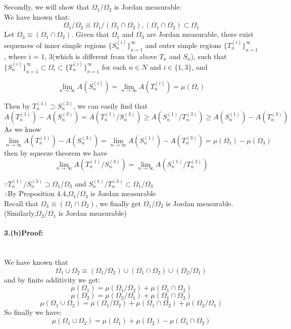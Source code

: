\documentclass{article}
\begin{document}
\\ \\
Secondly, we will show that $\Omega_1\slash \Omega_2$ is Jordan measurable:\\
We have known that:
$$\Omega_1\slash \Omega_2\equiv \Omega_1\slash (\Omega_1\cap\Omega_2),(\Omega_1\cap\Omega_2)\subset\Omega_1$$
Let $\Omega_3\equiv (\Omega_1\cap\Omega_2)$.
Given that $\Omega_1$ and $\Omega_3$ are Jordan measurable, there exist sequences
of inner simple regions $\{S_n^{(i)}\}^{\infty }_{n=1}$
and outer simple regions $\{T_n^{(i)}\}^\infty_{n=1}$, where i = 1, 3(which is different from the above $T_n$ and $S_n$), such that
$\{S_n^{(i)}\}^{\infty }_{n=1}\subset \Omega_i \subset \{T_n^{(i)}\}^\infty_{n=1}$  
for each $n \in N$ and  $i \in \{1, 3\}$, and

$$\lim_{n\to\infty}A(S_n^(i))=\lim_{n\to\infty}
A(T_n^{(i)})=\mu(\Omega_i)$$

Then by $T_n^{(1)}\supset S_n^{(3)}$,  we can easily find that
$$ A(T_n^{(1)})-A(S_n^{(3)})= A(T_n^{(1)}\slash S_n^{(3)})\geq A(S_n^{(1)}\slash T_n^{(3)})\geq A(S_n^{(1)})-A(T_n^{(3)}) $$
As we know
$$\lim_{n\to\infty}A(T_n^{(1)})-A(S_n^{(3)})=\lim_{n\to\infty}A(S_n^{(1)})-A(T_n^{(3)})=\mu(\Omega_1)-\mu(\Omega_3)$$
then by squeeze theorem we have
$$\lim_{n\to\infty} A(T_n^{(1)}\slash S_n^{(3)})=\lim_{n\to\infty} A(S_n^{(1)}\slash T_n^{(3)})$$


$\because T_n^{(1)}\slash S_n^{(3)}\supset \Omega_1\slash\Omega_3$ and 
$S_n^{(1)}\slash T_n^{(3)}\subset \Omega_1\slash\Omega_3$\\
$\therefore $By Proposition 4.4,$\Omega_1\slash\Omega_3$ is Jordan measurable\\
Recall that $\Omega_3\equiv (\Omega_1\cap\Omega_2)$, 
we finally get $\Omega_1\slash\Omega_2$ is Jordan measurable.(Similarly,$\Omega_2\slash\Omega_1$ is Jordan measurable)



\paragraph{3.(b)Proof:}\ \\We have known that 
$$\Omega_1\cup \Omega_2\equiv (\Omega_1\slash \Omega_2)
\cup(\Omega_1\cap\Omega_2)\cup(\Omega_2\slash\Omega_1) $$
and by finite additivity we get:
$$\mu(\Omega_1)=\mu(\Omega_1\slash \Omega_2)+\mu(\Omega_1\cap\Omega_2)$$
$$\mu(\Omega_2)=\mu(\Omega_2\slash \Omega_1)+\mu(\Omega_1\cap\Omega_2)$$
$$\mu(\Omega_1\cup \Omega_2)=\mu(\Omega_1\slash \Omega_2)
+\mu(\Omega_1\cap\Omega_2)+\mu(\Omega_2\slash\Omega_1) $$
So finally we have:
$$\mu(\Omega_1\cup\Omega_2)=\mu(\Omega_1)+\mu(\Omega_2)-\mu(\Omega_1\cap\Omega_2)$$
\end{document}
